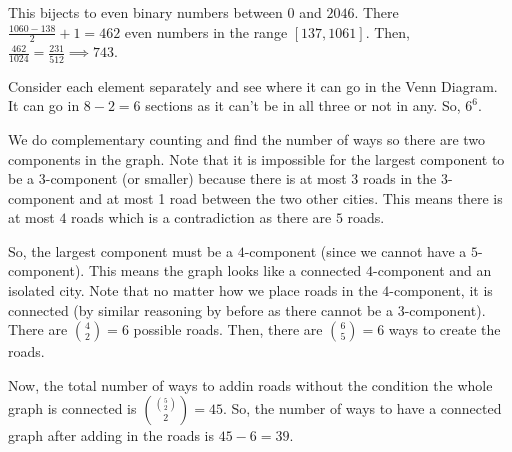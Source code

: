 \documentclass[11pt]{article}
\begin{document}
\begin{sol} 
This bijects to even binary numbers between $0$ and $2046$. There $\frac{1060-138}{2}+1=462$ even numbers in the range $[137,1061]$. Then, $\frac{462}{1024}=\frac{231}{512}\implies \boxed{743}$.
\end{sol}


\begin{sol}
Consider each element separately and see where it can go in the Venn Diagram. It can go in $8-2=6$ sections as it can't be in all three or not in any. So, $\boxed{6^6}$.
\end{sol}


\begin{sol}
We do complementary counting and find the number of ways so there are two components in the graph. Note that it is impossible for the largest component to be a $3$-component (or smaller) because there is at most 3 roads in the $3$-component and at most 1 road between the two other cities. This means there is at most $4$ roads which is a contradiction as there are $5$ roads.

So, the largest component must be a $4$-component (since we cannot have a $5$-component). This means the graph looks like a connected $4$-component and an isolated city. Note that no matter how we place roads in the $4$-component, it is connected (by similar reasoning by before as there cannot be a 3-component). There are $\binom{4}{2}=6$ possible roads. Then, there are $\binom{6}{5}=6$ ways to create the roads. 

Now, the total number of ways to addin roads without the condition the whole graph is connected is $\binom{\binom{5}{2}}{2}=45$. So, the number of ways to have a connected graph after adding in the roads is $45-6=\boxed{39}$.
\end{sol}
\end{document}
